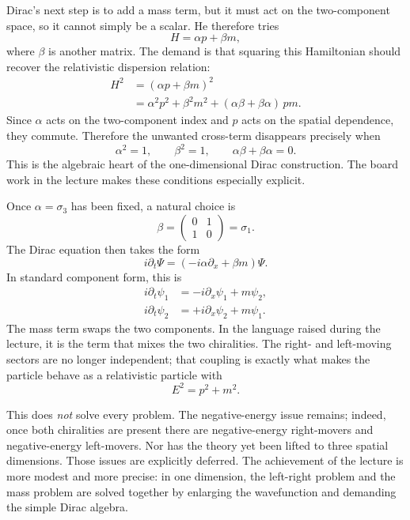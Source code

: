 Dirac's next step is to add a mass term, but it must act on the two-component space, so it cannot simply be a scalar. He therefore tries
\begin{equation}
H=\alpha p+\beta m,
\end{equation}
where \(\beta\) is another matrix. The demand is that squaring this Hamiltonian should recover the relativistic dispersion relation:
\begin{align}
H^2
&=
(\alpha p+\beta m)^2
\nonumber\\
&=
\alpha^2p^2+\beta^2m^2+(\alpha\beta+\beta\alpha)\,pm.
\end{align}
Since \(\alpha\) acts on the two-component index and \(p\) acts on the spatial dependence, they commute. Therefore the unwanted cross-term disappears precisely when
\begin{equation}
\alpha^2=1,
\qquad
\beta^2=1,
\qquad
\alpha\beta+\beta\alpha=0.
\end{equation}
This is the algebraic heart of the one-dimensional Dirac construction. The board work in the lecture makes these conditions especially explicit.

Once \(\alpha=\sigma_3\) has been fixed, a natural choice is
\begin{equation}
\beta=
\begin{pmatrix}
0 & 1\\
1 & 0
\end{pmatrix}
=\sigma_1.
\end{equation}
The Dirac equation then takes the form
\begin{equation}
i\partial_t\Psi=\left(-i\alpha\partial_x+\beta m\right)\Psi.
\end{equation}
In standard component form, this is
\begin{align}
i\partial_t\psi_1&=-i\partial_x\psi_1+m\psi_2,
\\
i\partial_t\psi_2&=+i\partial_x\psi_2+m\psi_1.
\end{align}
The mass term swaps the two components. In the language raised during the lecture, it is the term that mixes the two chiralities. The right- and left-moving sectors are no longer independent; that coupling is exactly what makes the particle behave as a relativistic particle with
\begin{equation}
E^2=p^2+m^2.
\end{equation}

This does \emph{not} solve every problem. The negative-energy issue remains; indeed, once both chiralities are present there are negative-energy right-movers and negative-energy left-movers. Nor has the theory yet been lifted to three spatial dimensions. Those issues are explicitly deferred. The achievement of the lecture is more modest and more precise: in one dimension, the left-right problem and the mass problem are solved together by enlarging the wavefunction and demanding the simple Dirac algebra.

